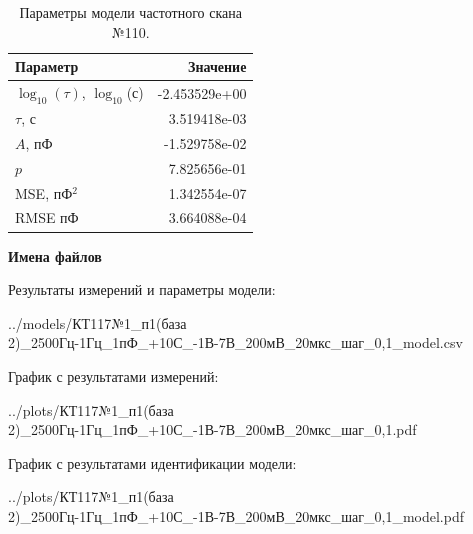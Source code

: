 \begin{table}[!ht]
    \centering
    \caption{Параметры модели частотного скана №110.}
    \begin{tabular}{|l|r|}
        \hline
        Параметр                                       & Значение                  \\ \hline
        $\log_{10}(\tau)$, $\log_{10}$(с)              & -2.453529e+00             \\ \hline
        $\tau$, с                                      & 3.519418e-03              \\ \hline
        $A$, пФ                                        & -1.529758e-02             \\ \hline
        $p$                                            & 7.825656e-01              \\ \hline
        MSE, пФ$^2$                                    & 1.342554e-07              \\ \hline
        RMSE пФ                                        & 3.664088e-04              \\ \hline
    \end{tabular}
    \label{table:frequency_scan_model_110}
\end{table}

\textbf{Имена файлов}

Результаты измерений и параметры модели:

\scriptsize../models/КТ117№1\_п1(база 2)\_2500Гц-1Гц\_1пФ\_+10С\_-1В-7В\_200мВ\_20мкс\_шаг\_0,1\_model.csv
\normalsize

График с результатами измерений:

\scriptsize../plots/КТ117№1\_п1(база 2)\_2500Гц-1Гц\_1пФ\_+10С\_-1В-7В\_200мВ\_20мкс\_шаг\_0,1.pdf
\normalsize

График с результатами идентификации модели:

\scriptsize../plots/КТ117№1\_п1(база 2)\_2500Гц-1Гц\_1пФ\_+10С\_-1В-7В\_200мВ\_20мкс\_шаг\_0,1\_model.pdf
\normalsize

